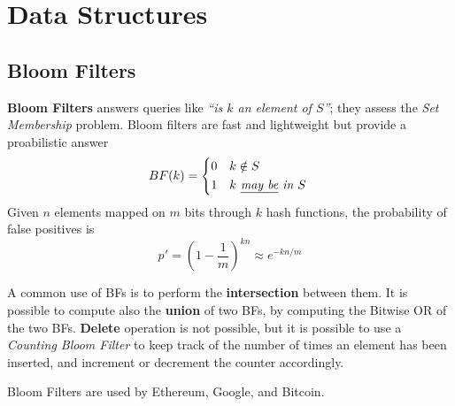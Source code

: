 \section{Data Structures}

\subsection{Bloom Filters}
\textbf{Bloom Filters} answers queries like \textit{``is $k$ an element of $S$''}; they assess the \textit{Set Membership} problem. Bloom filters are fast and lightweight but provide a proabilistic answer
\begin{equation}
   BF(k) = 
   \begin{cases*}
      $0$ & $k \notin S$\\
      $1$ & $k \textit{ \ul{may be} in } S$  
   \end{cases*}   
\end{equation}
Given $n$ elements mapped on $m$ bits through $k$ hash functions, the probability of false positives is
\begin{equation*}
   p' = \left( 1 - \frac{1}{m}\right) ^{kn} \approx e^{-kn/m}
\end{equation*}

A common use of BFs is to perform the \textbf{intersection} between them.
It is possible to compute also the \textbf{union} of two BFs, by computing the Bitwise OR of the two BFs.
\textbf{Delete} operation is not possible, but it is possible to use a \textit{Counting Bloom Filter} to keep track of the number of times an element has been inserted, and increment or decrement the counter accordingly.

Bloom Filters are used by Ethereum, Google, and Bitcoin.

